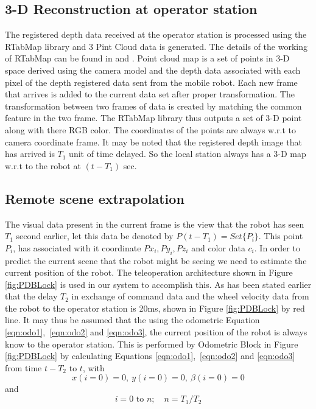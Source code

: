 \subsection{3-D Reconstruction at operator station}
The registered depth data received at the operator station is processed using the RTabMap library \cite{rtabmap} and 3 Pint Cloud data is generated. The details of the working of RTabMap can be found in \cite{labbertab} and \cite{labbe2013appearance}.  Point cloud map is a set of points in 3-D space derived using the camera model and the depth data associated with each pixel of the depth registered data sent from the mobile robot. Each new frame that arrives is added to the current data set after proper transformation. The transformation between two frames of data is created by matching the common feature in the two frame. The RTabMap library thus outputs a set of 3-D point along with there RGB color. The coordinates of the points are always  w.r.t to camera coordinate frame. It may be noted that the registered depth image that has arrived is $T_1$ unit of time delayed. So the local station always has a 3-D map w.r.t to the robot at $(t-T_1)$ sec.
 

\subsection{Remote scene extrapolation} 
The visual data present in the current frame is the view that the robot has seen $T_1$ second earlier, let this data be denoted by $P(t-T_1)=Set\{P_i\}$. This point $P_i$, has associated with it coordinate ${Px_i,Py_i,Pz_i}$ and color data $c_i$. In order to predict the current scene that the robot might be seeing we need to estimate the current position of the robot. The teleoperation architecture shown in Figure \ref{fig:PDBLock} is used in our system to accomplish this. As has been stated earlier that the delay $T_2$ in exchange of command data and the wheel velocity data from the robot to the operator station is 20ms, shown in Figure \ref{fig:PDBLock} by red line. It may thus be assumed that the using the odometric Equation \ref{eqn:odo1},~\ref{eqn:odo2} and \ref{eqn:odo3}, the current position of the robot is always know to the operator station. This is performed by Odometric Block in Figure \ref{fig:PDBLock} by calculating Equations \ref{eqn:odo1},~\ref{eqn:odo2} and \ref{eqn:odo3} from time $t-T_2$ to $t$, with \[x(i=0)=0,~y(i=0)=0 ,~ \beta(i=0)=0\] and  \[ i=0 \text{ to } n;  \quad n=T_1/T_2\] 


